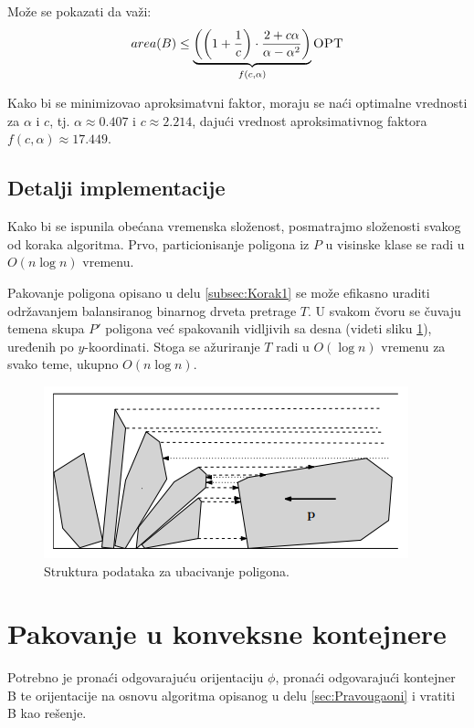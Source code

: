 \documentclass[a4paper]{article}
\theoremstyle{plain}
\theoremstyle{definition}
\begin{document}
Mo\v{z}e se pokazati da va\v{z}i: $$area(B) \leq \underbrace{\left(\left(1+\frac{1}{c}\right) \cdot \frac{2 + c\alpha}{\alpha - \alpha^{2}}\right)}_{f(c,\alpha)} \textsc{OPT}$$ 

Kako bi se minimizovao aproksimatvni faktor, moraju se na\'c{}i optimalne vrednosti za $\alpha$ i $c$, tj. $\alpha \approx 0.407$ i $c \approx 2.214$, daju\'c{}i vrednost aproksimativnog faktora $f(c, \alpha) \approx 17.449$.


\subsection{Detalji implementacije}
\label{subsec:Implementacija}

Kako bi se ispunila obe\'c{}ana vremenska slo\v{z}enost, posmatrajmo slo\v{z}enosti svakog od koraka algoritma. Prvo, particionisanje poligona iz $P$ u visinske klase se radi u $O(n\log{}n)$ vremenu.

Pakovanje poligona opisano u delu \ref{subsec:Korak1} se mo\v{z}e efikasno uraditi odr\v{z}avanjem balansiranog binarnog drveta pretrage $T$. U svakom \v{c}voru se \v{c}uvaju temena skupa $P'$ poligona ve\'c{} spakovanih vidljivih sa desna (videti sliku \ref{fig2}), uređenih po $y$-koordinati. Stoga se a\v{z}uriranje $T$ radi u $O(\log{}n)$ vremenu za svako teme, ukupno $O(n\log{}n)$. 

\begin{figure}[H]
    \centering
    \includegraphics[scale=0.5]{resources/fig2.PNG}
    \caption{Struktura podataka za ubacivanje poligona.}
    \label{fig2}
\end{figure}


\section{Pakovanje u konveksne kontejnere}
\label{sec:Konveksni}

Potrebno je prona\'c{}i odgovaraju\'c{}u orijentaciju $\phi$, prona\'c{}i odgovaraju\'c{}i kontejner B te orijentacije na osnovu algoritma opisanog u delu \ref{sec:Pravougaoni} i vratiti B kao re\v{s}enje.
\end{document}
